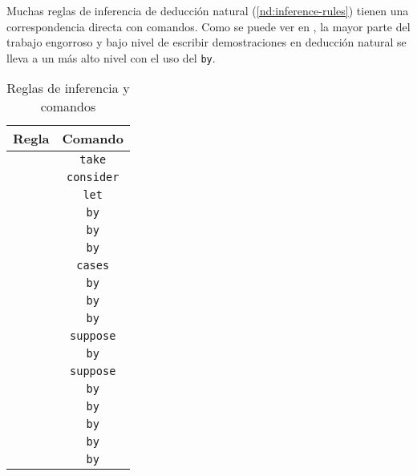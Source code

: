 Muchas reglas de inferencia de deducción natural (\ref{nd:inference-rules})
tienen una correspondencia directa con comandos. Como se puede ver en , la mayor
parte del trabajo engorroso y bajo nivel de escribir demostraciones en deducción
natural se lleva a un más alto nivel con el uso del \lstinline{by}.
\begin{table}[H]
    \centering
    \begin{tabular}{c|c}
    Regla & Comando \\
    \hline
        &   \lstinline|take| \\
        &   \lstinline|consider| \\
        &   \lstinline|let| \\
        &   \lstinline|by| \\
         &   \lstinline|by| \\
         &   \lstinline|by| \\
            &   \lstinline|cases| \\
           &   \lstinline|by| \\
        &   \lstinline|by| \\
        &   \lstinline|by| \\
           &   \lstinline|suppose| \\
           &   \lstinline|by| \\
           &   \lstinline|suppose| \\
           &   \lstinline|by| \\
          &   \lstinline|by| \\
         &   \lstinline|by| \\
            &   \lstinline|by| \\
             &   \lstinline|by|
    \end{tabular}
    \caption{Reglas de inferencia y comandos}
    \label{ppa:tab:inference-rules-to-commands}
\end{table}


